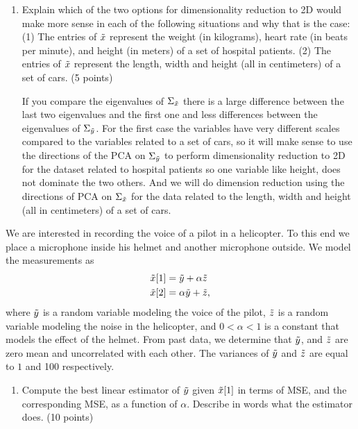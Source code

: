 \documentclass[11pt,twoside]{article}
\begin{document}
\begin{exam}
\begin{exercise}
\begin{problem}
\begin{enumerate}
\item Explain which of the two options for dimensionality reduction to 2D would make more sense in each of the following situations and why that is the case: (1) The entries of $\tilde{  x }$ represent the weight (in kilograms), heart rate (in beats per minute), and height (in meters) of a set of hospital patients. (2) The entries of $\tilde{  x }$ represent the length, width and height (all in centimeters) of a set of cars.  (5 points)


If you compare the eigenvalues of $\Sigma_{\tilde{  x }}$ there is a large difference between the last two eigenvalues  and the first one and less differences between the eigenvalues of  $\Sigma_{\tilde{  y }}$.
For the first case the variables have very different scales compared to the variables related to a set of cars, so it will make sense to use the directions of the PCA on $\Sigma_{\tilde{  y }}$ to perform dimensionality reduction to 2D 
for the dataset related to hospital patients so one variable like height, does not dominate the two others. And we will do dimension reduction using  the directions of PCA on $\Sigma_{\tilde{  x }}$ for the data related to 
the length, width and height (all in centimeters) of a set of cars.


\end{enumerate}

\end{problem}

\end{exercise}

\newpage

\item
\begin{exercise} 
\begin{problem} 
We are interested in recording the voice of a pilot in a helicopter. To this end we place a microphone inside his helmet and another microphone outside. We model the measurements as
\begin{align}
\tilde{  x }[1] & = \tilde{  y } + \alpha \tilde{ z }\\
\tilde{  x }[2] & = \alpha \tilde{  y } + \tilde{ z },
\end{align}
where $\tilde{  y }$ is a random variable modeling the voice of the pilot, $\tilde{ z }$ is a random variable modeling the noise in the helicopter, and $0 < \alpha < 1$ is a constant that models the effect of the helmet. From past data, we determine that $\tilde{  y }$, and $\tilde{ z }$ are zero mean and uncorrelated with each other. The variances of $\tilde{  y }$  and $\tilde{ z }$ are equal to $1$ and 100 respectively.
\begin{enumerate}
\item Compute the best linear estimator of $\tilde{  y }$ given $\tilde{  x }[1]$ in terms of MSE, and the corresponding MSE, as a function of $\alpha$. Describe in words what the estimator does.  (10 points)\\


\end{enumerate}
\end{problem}
\end{exercise}
\end{exam}
\end{document}

